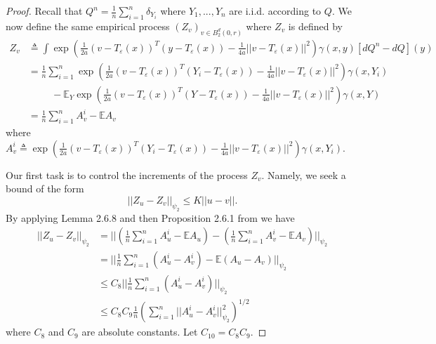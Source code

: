 \documentclass{article}
\theoremstyle{definition}
\newcommand{\Teps}{T_\varepsilon}
\begin{document}
\begin{proof}
    Recall that $Q^n = \frac{1}{n} \sum_{i=1}^n \delta_{Y_i}$ where $Y_1,...,Y_n$ are i.i.d. according to $Q$. We now define the same empirical process $(Z_v)_{v \in B_2^d(0,r)}$ where $Z_v$ is defined by
    \begin{align*}
        Z_v &\triangleq \int \exp\left ( \frac{1}{2a}\left ( v - \Teps(x) \right )^T(y - \Teps(x)) - \frac{1}{4a}||v - \Teps(x)||^2 \right )\gamma(x,y)[dQ^n - dQ](y) \\
        &= \frac{1}{n}\sum_{i=1}^n  \exp\left ( \frac{1}{2a}\left ( v - \Teps(x) \right )^T(Y_i - \Teps(x)) - \frac{1}{4a}||v - \Teps(x)||^2 \right )\gamma(x,Y_i) \\
        & \hspace{1cm} - \mathbb{E}_Y \exp\left ( \frac{1}{2a}\left ( v - \Teps(x) \right )^T(Y - \Teps(x)) - \frac{1}{4a}||v - \Teps(x)||^2 \right )\gamma(x,Y) \\
        &= \frac{1}{n}\sum_{i=1}^n A^i_v - \mathbb{E}A_v
    \end{align*}
    where $A_v^i \triangleq \exp\left ( \frac{1}{2a}\left ( v - \Teps(x) \right )^T(Y_i - \Teps(x)) - \frac{1}{4a}||v - \Teps(x)||^2 \right )\gamma(x,Y_i)$.
    
   Our first task is to control the increments of the process $Z_v$. Namely, we seek a bound of the form
    \begin{equation*}
        ||Z_u - Z_v||_{\psi_2} \leq K||u - v||.
    \end{equation*}
    By applying Lemma 2.6.8 and then Proposition 2.6.1 from \cite{vershynin2018high} we have
    \begin{align}
        ||Z_u - Z_v||_{\psi_2} &= ||(\frac{1}{n}\sum_{i=1}^n A^i_u - \mathbb{E}A_u) - (\frac{1}{n}\sum_{i=1}^n A^i_v - \mathbb{E}A_v)||_{\psi_2} \nonumber \\
        &= ||\frac{1}{n}\sum_{i=1}^n (A^i_u - A^i_v) - \mathbb{E}(A_u - A_v)||_{\psi_2} \nonumber \\
        &\leq C_8 ||\frac{1}{n}\sum_{i=1}^n (A^i_u - A^i_v)||_{\psi_2} \nonumber \\
        &\leq C_8C_9 \frac{1}{n} \left ( \sum_{i=1}^n  ||A^i_u - A^i_v||_{\psi_2}^2 \right )^{1/2} \label{eq:AuAv_squared}
    \end{align}
    where $C_8$ and $C_9$ are absolute constants. Let $C_{10} = C_8C_9$.
    

\end{proof}
\end{document}
